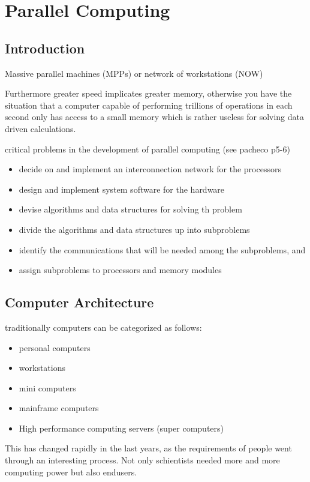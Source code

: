 \chapter{Parallel Computing}
\section{Introduction}

Massive parallel machines (MPPs) or network of workstations (NOW)


Furthermore greater speed implicates greater memory, otherwise you have
the situation that a computer capable of performing trillions of
operations in each second only has access to a small memory which is
rather useless for solving data driven calculations.


critical problems in the development of parallel computing (see
pacheco p5-6)
\begin{itemize}
\item decide on and implement an interconnection network for the
  processors
\item design and implement system software for the hardware
\item devise algorithms and data structures for solving th problem
\item divide the algorithms and data structures up into subproblems
\item identify the communications that will be needed among the
  subproblems, and
\item assign subproblems to processors and memory modules
\end{itemize}

\section{Computer Architecture}

traditionally computers can be  categorized as follows:
\begin{itemize}
\item personal computers
\item workstations
\item mini computers
\item mainframe computers
\item High performance computing servers (super computers)
\end{itemize}

This has changed rapidly in the last years, as the requirements of
people went through an interesting process. Not only schientists
needed more and more computing power but also endusers. 

